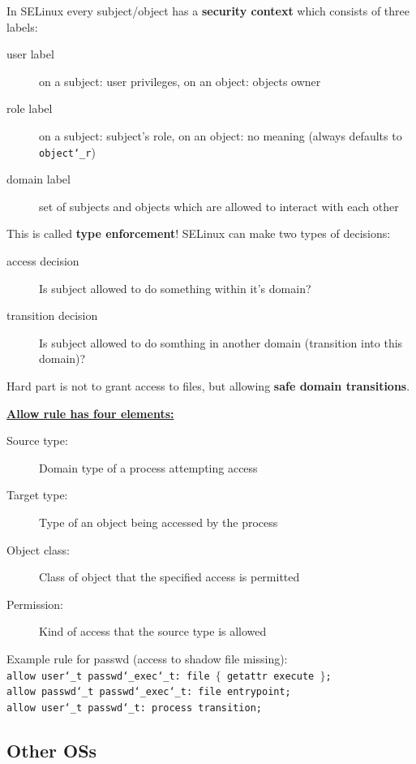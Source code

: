 In SELinux every subject/object has a \textbf{security context} which consists of three labels:\vspace{-1.5mm}
\begin{description}
    \item[user label] on a subject: user privileges, on an object: objects owner
    \item[role label]  on a subject: subject's role, on an object: no meaning (always defaults to \texttt{object\char`_r})
    \item[domain label] set of subjects and objects which are allowed to interact with each other
\end{description}
This is called \textbf{type enforcement}! SELinux can make two types of decisions:\vspace{-1.5mm}
\begin{description}
    \item[access decision] Is subject allowed to do something within it's domain?
    \item[transition decision] Is subject allowed to do somthing in another domain (transition into this domain)?
\end{description}
Hard part is not to grant access to files, but allowing \textbf{safe domain transitions}.

\underline{\textbf{Allow rule has four elements:}}
\begin{description}
  \item[Source type:] Domain type of a process attempting access
  \item[Target type:] Type of an object being accessed by the process
  \item[Object class:] Class of object that the specified access is permitted
  \item[Permission:] Kind of access that the source type is allowed
\end{description}

Example rule for passwd (access to shadow file missing):\\
\texttt{allow user\char`_t passwd\char`_exec\char`_t: file $\{$ getattr execute $\}$; \\ allow passwd\char`_t passwd\char`_exec\char`_t: file entrypoint; \\ allow user\char`_t passwd\char`_t: process transition;}

\subsection{Other OSs}
